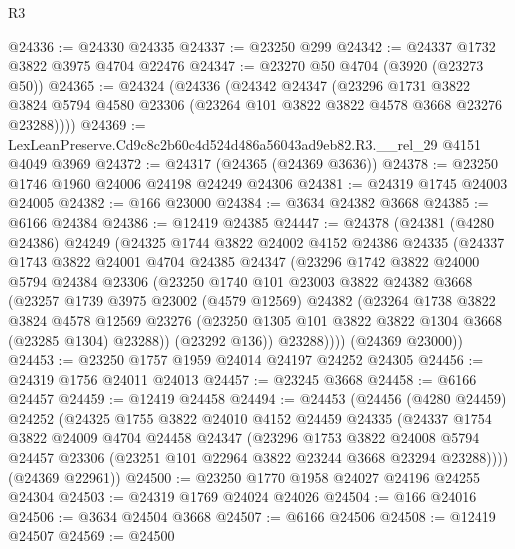 \begin{lexlean}{R3}
\begin{coremodule}
@24336 := @24330 @24335
@24337 := @23250 @299
@24342 := @24337 @1732 @3822 @3975 @4704 @22476
@24347 := @23270 @50 @4704 (@3920 (@23273 @50))
@24365 := @24324
    (@24336
      (@24342
        @24347
        (@23296
          @1731
          @3822
          @3824
          @5794
          @4580
          @23306
          (@23264 @101 @3822 @3822 @4578 @3668 @23276 @23288))))
@24369 := LexLeanPreserve.Cd9c8c2b60c4d524d486a56043ad9eb82.R3.__rel_29 @4151 @4049 @3969
@24372 := @24317 (@24365 (@24369 @3636))
@24378 := @23250 @1746 @1960 @24006 @24198 @24249 @24306
@24381 := @24319 @1745 @24003 @24005
@24382 := @166 @23000
@24384 := @3634 @24382 @3668
@24385 := @6166 @24384
@24386 := @12419 @24385
@24447 := @24378
    (@24381
      (@4280 @24386)
      @24249
      (@24325
        @1744
        @3822
        @24002
        @4152
        @24386
        @24335
        (@24337
          @1743
          @3822
          @24001
          @4704
          @24385
          @24347
          (@23296
            @1742
            @3822
            @24000
            @5794
            @24384
            @23306
            (@23250
              @1740
              @101
              @23003
              @3822
              @24382
              @3668
              (@23257
                @1739
                @3975
                @23002
                (@4579 @12569)
                @24382
                (@23264
                  @1738
                  @3822
                  @3824
                  @4578
                  @12569
                  @23276
                  (@23250 @1305 @101 @3822 @3822 @1304 @3668 (@23285 @1304) @23288))
                (@23292 @136))
              @23288))))
      (@24369 @23000))
@24453 := @23250 @1757 @1959 @24014 @24197 @24252 @24305
@24456 := @24319 @1756 @24011 @24013
@24457 := @23245 @3668
@24458 := @6166 @24457
@24459 := @12419 @24458
@24494 := @24453
    (@24456
      (@4280 @24459)
      @24252
      (@24325
        @1755
        @3822
        @24010
        @4152
        @24459
        @24335
        (@24337
          @1754
          @3822
          @24009
          @4704
          @24458
          @24347
          (@23296
            @1753
            @3822
            @24008
            @5794
            @24457
            @23306
            (@23251 @101 @22964 @3822 @23244 @3668 @23294 @23288))))
      (@24369 @22961))
@24500 := @23250 @1770 @1958 @24027 @24196 @24255 @24304
@24503 := @24319 @1769 @24024 @24026
@24504 := @166 @24016
@24506 := @3634 @24504 @3668
@24507 := @6166 @24506
@24508 := @12419 @24507
@24569 := @24500

\end{coremodule}
\end{lexlean}
